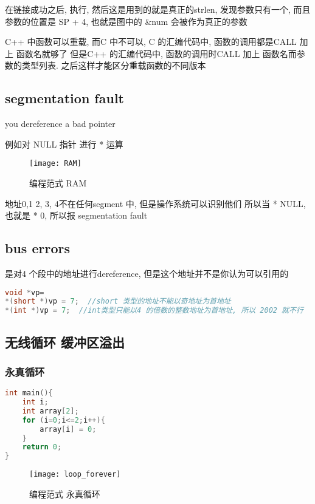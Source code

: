 \documentclass{article}
\begin{document}
在链接成功之后, 执行, 然后这是用到的就是真正的strlen, 发现参数只有一个, 而且参数的位置是
SP + 4, 也就是图中的 \&num 会被作为真正的参数

C++ 中函数可以重载, 而C 中不可以,
C 的汇编代码中, 函数的调用都是CALL 加上 函数名就够了
但是C++ 的汇编代码中, 函数的调用时CALL 加上 函数名而参数的类型列表. 之后这样才能区分重载函数的不同版本

\subsection{segmentation fault}
you dereference a bad pointer

例如对 NULL 指针 进行 * 运算
\begin{figure}[htbp]
	\centering
	\texttt{[image: RAM]}\\
	\caption{编程范式 RAM}\label{fig.RAM}
\end{figure}

地址0,1 2, 3, 4不在任何segment 中, 但是操作系统可以识别他们
所以当 * NULL, 也就是 * 0, 所以报 segmentation fault

\subsection{bus errors}
是对4 个段中的地址进行dereference, 但是这个地址并不是你认为可以引用的
\begin{lstlisting}[language = C]
void *vp=
*(short *)vp = 7;  //short 类型的地址不能以奇地址为首地址
*(int *)vp = 7;  //int类型只能以4 的倍数的整数地址为首地址, 所以 2002 就不行
\end{lstlisting}

\subsection{无线循环 缓冲区溢出}
\subsubsection{永真循环}
\begin{lstlisting}[language = C]
int main(){
	int i;
	int array[2];
	for (i=0;i<=2;i++){
		array[i] = 0;
	}
	return 0;
}
\end{lstlisting}
\begin{figure}[htbp]
	\centering
	\texttt{[image: loop\_forever]}\\
	\caption{编程范式 永真循环}\label{fig.loop_forever}
\end{figure}
\end{document}
